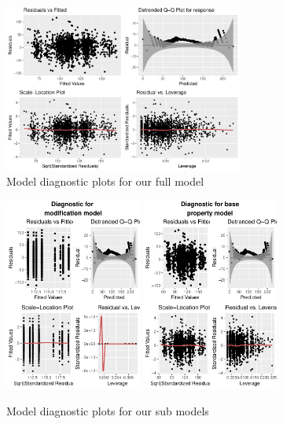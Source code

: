 \documentclass[9pt]{extarticle}
\begin{document}
\begin{figure}[H]
	\centering
	\includegraphics[width=0.7\textwidth]{fm_diag}
	\caption{Model diagnostic plots for our full model}
	\label{fig:fmdiag}
\end{figure}

\begin{figure}[H]
	\centering
	\includegraphics[width=0.4\textwidth]{diag_modif}
	\includegraphics[width=0.4\textwidth]{diag_prop}
	\caption{Model diagnostic plots for our sub models}
	\label{fig:smdiag}
\end{figure}
\end{document}
